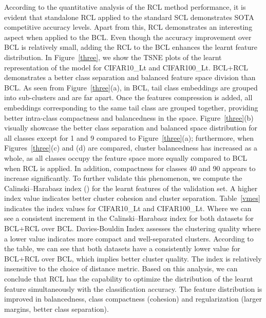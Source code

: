 According to the quantitative analysis of the RCL method performance, it is evident that standalone RCL applied to the standard SCL demonstrates SOTA competitive accuracy levels. Apart from this, RCL demonstrates an interesting aspect when applied to the BCL. Even though the accuracy improvement over BCL is relatively small, adding the RCL to the BCL enhances the learnt feature distribution. In Figure~\ref{three}, we show the TSNE plots of the learnt representation of the model for CIFAR10\_Lt and CIFAR100\_Lt. BCL+RCL demonstrates a better class separation and balanced feature space division than BCL. As seen from Figure~\ref{three}(a), in BCL, tail class embeddings are grouped into sub-clusters and are far apart. Once the features compression is added, all embeddings corresponding to the same tail class are grouped together, providing better intra-class compactness and balancedness in the space.  Figure~\ref{three}(b) visually showcase the better class separation and balanced space distribution for all classes except for 1 and 9 compared to Figure~\ref{three}(a); furthermore, when Figures~\ref{three}(c) and (d) are compared, cluster balancedness has increased as a whole, as all classes occupy the feature space more equally compared to BCL when RCL is applied. In addition, compactness for classes 40 and 90 appears to increase significantly. To further validate this phenomenon, we compute the   Calinski–Harabasz index (\cite{calin}) for the learnt features of the validation set.  A higher index value indicates better cluster cohesion and cluster separation.  Table~\ref{vmes} indicates the index values for CIFAR10\_Lt and CIFAR100\_Lt.  Where we can see a consistent increment in the Calinski–Harabasz index for both datasets for BCL+RCL over BCL. Davies-Bouldin Index assesses the clustering quality where a lower value indicates more compact and well-separated clusters. According to the table, we can see that both datasets have a consistently lower value for BCL+RCL over BCL, which implies better cluster quality. The index is relatively insensitive to the choice of distance metric. Based on this analysis, we can conclude that RCL has the capability to optimize the distribution of the learnt feature simultaneously with the classification accuracy. The feature distribution is improved in balancedness, class compactness (cohesion) and regularization (larger margins, better class separation).

